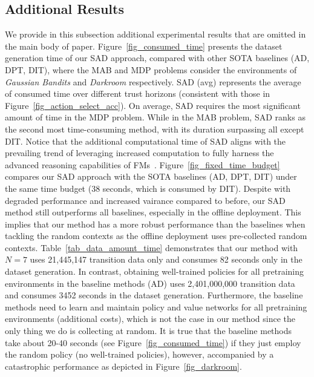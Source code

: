 \documentclass[10pt]{article}
\begin{document}
\subsection{Additional Results}
\label{appendix_experiment_detail_addition_result}
We provide in this subsection additional experimental results that are omitted in the main body of paper.
Figure~\ref{fig_consumed_time} presents the dataset generation time of our SAD approach, compared with other SOTA baselines (AD, DPT, DIT), where the MAB and MDP problems consider the environments of \textit{Gaussian Bandits} and \textit{Darkroom} respectively. SAD (avg) represents the average of consumed time over different trust horizons (consistent with those in Figure~\ref{fig_action_select_acc}).
On average, SAD requires the most significant amount of time in the MDP problem. While in the MAB problem, SAD ranks as the second most time-consuming method, with its duration surpassing all except DIT.
Notice that the additional computational time of SAD aligns with the prevailing trend of leveraging increased computation to fully harness the advanced reasoning capabilities of FMs~\citep{brown2020language}.
Figure~\ref{fig_fixed_time_budget} compares our SAD approach with the SOTA baselines (AD, DPT, DIT) under the same time budget (38 seconds, which is consumed by DIT).
Despite with degraded performance and increased vairance compared to before, our SAD method still outperforms all baselines, especially in the offline deployment. This implies that our method has a more robust performance than the baselines when tackling the random contexts as the offline deployment uses pre-collected random contexts.
Table~\ref{tab_data_amount_time} demonstrates that our method with $N=7$ uses 21,445,147 transition data only and consumes 82 seconds only in the dataset generation. In contrast, obtaining well-trained policies for all pretraining environments in the baseline methods (AD) uses 2,401,000,000 transition data and consumes 3452 seconds in the dataset generation. Furthermore, the baseline methods need to learn and maintain policy and value networks for all pretraining environments (additional costs), which is not the case in our method since the only thing we do is collecting at random. It is true that the baseline methods take about 20-40 seconds (see Figure~\ref{fig_consumed_time}) if they just employ the random policy (no well-trained policies), however, accompanied by a catastrophic performance as depicted in Figure~\ref{fig_darkroom}.
\renewcommand{\arraystretch}{1.2}
\end{document}
